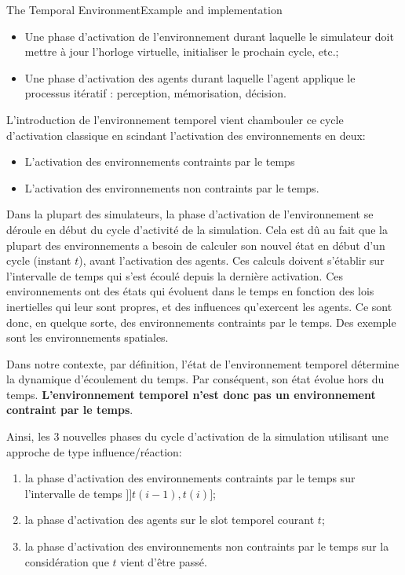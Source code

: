 \begin{frame}{The Temporal Environment}{Example and implementation}
{{\begin{itemize}
   \item Une phase d’activation de l’environnement durant laquelle le simulateur doit mettre à jour l’horloge virtuelle, initialiser le prochain cycle, etc.;
    \item Une phase d'activation des agents durant laquelle l'agent applique le processus itératif : perception, mémorisation, décision. 
\end{itemize}
L'introduction de l'environnement temporel vient chambouler ce cycle d'activation classique en scindant l'activation des environnements en deux:
\begin{itemize}
    \item L'activation des environnements contraints par le temps
    \item L'activation des environnements non contraints par le temps.
\end{itemize}
Dans la plupart des simulateurs, la phase d'activation de l'environnement se déroule en début du cycle d'activité de la simulation. Cela est dû au fait que la plupart des environnements a besoin de calculer son nouvel état en début d'un cycle (instant $t$), avant l'activation des agents. Ces calculs doivent  s'établir sur l'intervalle de temps qui s'est écoulé depuis la dernière activation. Ces environnements ont des états qui évoluent dans le temps en fonction des lois inertielles qui leur sont propres, et des influences qu'exercent les agents. Ce sont donc, en quelque sorte, des environnements contraints par le temps. Des exemple sont les environnements spatiales.
\par Dans notre contexte, par définition, l'état de l'environnement temporel détermine la dynamique d'écoulement du temps. Par conséquent, son état évolue hors du temps. \textbf{L'environnement temporel n'est donc pas un environnement contraint par le temps}. 
\par Ainsi, les 3 nouvelles phases du cycle d'activation de la simulation utilisant une approche de type influence/réaction:
\begin{enumerate}
    \item la phase d'activation des environnements contraints par le temps sur l'intervalle de temps $] ]t(i-1), t(i)]$; 
    \item la phase d'activation des agents sur le slot temporel courant $t$;
    \item la phase d'activation des environnements non contraints par le temps sur la considération que $t$ vient d'être passé.
\end{enumerate}
}
}
\end{frame}


